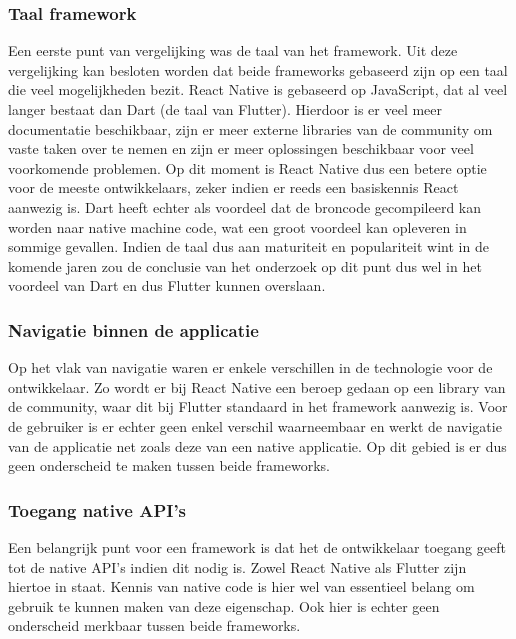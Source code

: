 \subsubsection{Taal framework}

Een eerste punt van vergelijking was de taal van het framework. Uit deze vergelijking kan besloten worden dat beide frameworks gebaseerd zijn op een taal die veel mogelijkheden bezit. React Native is gebaseerd op JavaScript, dat al veel langer bestaat dan Dart (de taal van Flutter). Hierdoor is er veel meer documentatie beschikbaar, zijn er meer externe libraries van de community om vaste taken over te nemen en zijn er meer oplossingen beschikbaar voor veel voorkomende problemen. Op dit moment is React Native dus een betere optie voor de meeste ontwikkelaars, zeker indien er reeds een basiskennis React aanwezig is. Dart heeft echter als voordeel dat de broncode gecompileerd kan worden naar native machine code, wat een groot voordeel kan opleveren in sommige gevallen. Indien de taal dus aan maturiteit en populariteit wint in de komende jaren zou de conclusie van het onderzoek op dit punt dus wel in het voordeel van Dart en dus Flutter kunnen overslaan.

\subsubsection{Navigatie binnen de applicatie}

Op het vlak van navigatie waren er enkele verschillen in de technologie voor de ontwikkelaar. Zo wordt er bij React Native een beroep gedaan op een library van de community, waar dit bij Flutter standaard in het framework aanwezig is. Voor de gebruiker is er echter geen enkel verschil waarneembaar en werkt de navigatie van de applicatie net zoals deze van een native applicatie. Op dit gebied is er dus geen onderscheid te maken tussen beide frameworks.

\subsubsection{Toegang native API's}

Een belangrijk punt voor een framework is dat het de ontwikkelaar toegang geeft tot de native API's indien dit nodig is. Zowel React Native als Flutter zijn hiertoe in staat. Kennis van native code is hier wel van essentieel belang om gebruik te kunnen maken van deze eigenschap. Ook hier is echter geen onderscheid merkbaar tussen beide frameworks.

